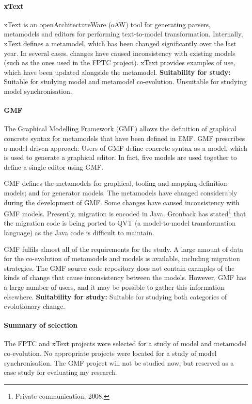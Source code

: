 \paragraph{xText} %
\label{par:xtext}
xText is an openArchitectureWare (oAW) \cite{oaw} tool for generating parsers, metamodels and editors for performing text-to-model transformation. Internally, xText defines a metamodel, which has been changed significantly over the last year. In several cases, changes have caused inconsistency with existing models (such as the ones used in the FPTC project). xText provides examples of use, which have been updated alongside the metamodel. \textbf{Suitability for study:} Suitable for studying model and metamodel co-evolution. Unsuitable for studying model synchronisation.

\paragraph{GMF} %
\label{par:gmf}
The Graphical Modelling Framework (GMF) \cite{gronback06gmf} allows the definition of graphical concrete syntax for metamodels that have been defined in EMF. GMF prescribes a model-driven approach: Users of GMF define concrete syntax as a model, which is used to generate a graphical editor. In fact, five models are used together to define a single editor using GMF.

GMF defines the metamodels for graphical, tooling and mapping definition models; and for generator models. The metamodels have changed considerably during the development of GMF. Some changes have caused inconsistency with GMF models. Presently, migration is encoded in Java. Gronback has stated\footnote{Private communication, 2008.} that the migration code is being ported to QVT (a model-to-model transformation language) as the Java code is difficult to maintain.

GMF fulfils almost all of the requirements for the study. A large amount of data for the co-evolution of metamodels and models is available, including migration strategies. The GMF source code repository does not contain examples of the kinds of change that cause inconsistency between the models. However, GMF has a large number of users, and it may be possible to gather this information elsewhere. \textbf{Suitability for study:} Suitable for studying both categories of evolutionary change.

\paragraph{Summary of selection}
The FPTC and xText projects were selected for a study of model and metamodel co-evolution. No appropriate projects were located for a study of model synchronisation. The GMF project will not be studied now, but reserved as a case study for evaluating my research.

